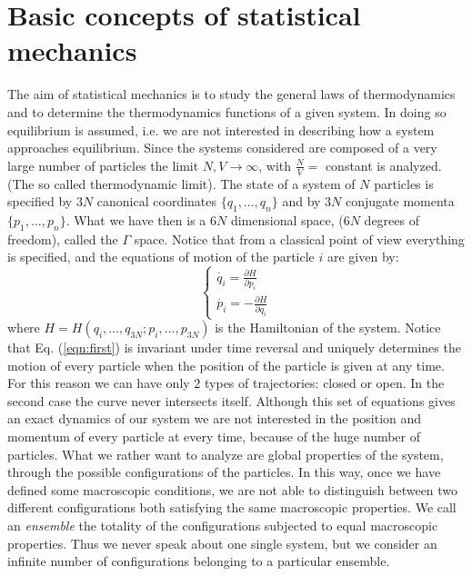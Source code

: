 \section{Basic concepts of statistical mechanics}
The aim of statistical mechanics is to study the general laws of thermodynamics and to determine the thermodynamics functions of a given system. In doing so equilibrium is assumed, i.e. we are not interested in describing how a system approaches equilibrium. Since the systems considered are composed of a very large number of particles the limit $N, V\to\infty$, with $\frac{N}{V} =$ constant is analyzed. (The so called thermodynamic limit).
The state of a system of $N$ particles is specified by $3N$ canonical coordinates $\{q_1,\dots,q_n\}$ and by $3N$ conjugate momenta $\{p_1,\dots,p_n\}$. What we have then is a $6N$ dimensional space, ($6N$ degrees of freedom), called the $\Gamma$ space. Notice that from a classical point of view everything is specified, and the equations of motion of the particle $i$ are given by:
\begin{equation}
\label{eqn:first}
\begin{cases}
\dot{q_i} = \frac{\partial H}{\partial p_i} \\
\dot{p_i} = -\frac{\partial H}{\partial q_i} 
\end{cases}
\end{equation}
where $H = H(q_i,\dots,q_{3N};p_i,\dots,p_{3N})$ is the Hamiltonian of the system. Notice that Eq. (\ref{eqn:first}) is invariant under time reversal and uniquely determines the motion of every particle when the position of the particle is given at any time. For this reason we can have only $2$ types of trajectories: closed or open. In the second case the curve never intersects itself.
Although this set of equations gives an exact dynamics of our system we are not interested in the position and momentum of every particle at every time, because of the huge number of particles. What we rather want to analyze are global properties of the system, through the possible configurations of the particles. In this way, once we have defined some macroscopic conditions, we are not able to distinguish between two different configurations both satisfying the same macroscopic properties. We call an \textit{ensemble} the totality of the configurations subjected to equal macroscopic properties. Thus we never speak about one single system, but we consider an infinite number of configurations belonging to a particular ensemble.

